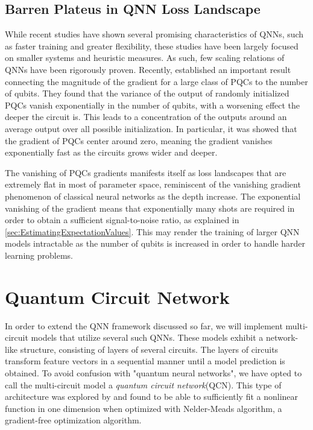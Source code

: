 \subsection{Barren Plateus in QNN Loss Landscape}\label{sec:BarrenPlateus}
While recent studies have shown several promising characteristics of QNNs, such as faster training and greater flexibility\cite{abbas2020power}, these studies have been largely focused on smaller systems and heuristic measures. As such, few scaling relations of QNNs have been rigorously proven. Recently, \citet{McClean_2018} established an important result connecting the magnitude of the gradient for a large class of PQCs to the number of qubits. They found that the variance of the output of randomly initialized PQCs vanish exponentially in the number of qubits, with a worsening effect the deeper the circuit is. This leads to a concentration of the outputs around an average output over all possible initialization. In particular, it was showed that the gradient of PQCs center around zero, meaning the gradient vanishes exponentially fast as the circuits grows wider and deeper.  


The vanishing of PQCs gradients manifests itself as loss landscapes that are extremely flat in most of parameter space, reminiscent of the vanishing gradient phenomenon of classical neural networks as the depth increase\cite{shalevshwartz2017failures}. The exponential vanishing of the gradient means that exponentially many shots are required in order to obtain a sufficient signal-to-noise ratio, as explained in \autoref{sec:EstimatingExpectationValues}. This may render the training of larger QNN models intractable as the number of qubits is increased in order to handle harder learning problems.


\section{Quantum Circuit Network}\label{sec:Quantum Circuit Network}
In order to extend the QNN framework discussed so far, we will implement multi-circuit models that utilize several such QNNs. These models exhibit a network-like structure, consisting of layers of several circuits. The layers of circuits transform feature vectors in a sequential manner until a model prediction is obtained. To avoid confusion with "quantum neural networks", we have opted to call the multi-circuit model a \emph{quantum circuit network}(QCN). This type of architecture was explored by \citet{b} and found to be able to sufficiently fit a nonlinear function in one dimension when optimized with Nelder-Meads algorithm, a gradient-free optimization algorithm.



